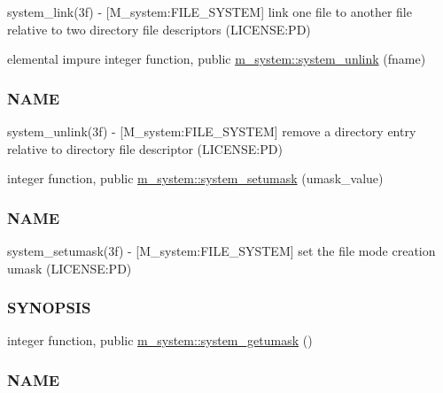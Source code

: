 \begin{DoxyCompactItemize}
\begin{DoxyCompactList}
system\+\_\+link(3f) -\/ \mbox{[}M\+\_\+system\+:F\+I\+L\+E\+\_\+\+S\+Y\+S\+T\+EM\mbox{]} link one file to another file relative to two directory file descriptors (L\+I\+C\+E\+N\+SE\+:PD) \end{DoxyCompactList}\item 
elemental impure integer function, public \mbox{\hyperlink{namespacem__system_a3561c9beafec28439f760d701d55a6b8}{m\+\_\+system\+::system\+\_\+unlink}} (fname)
\begin{DoxyCompactList}\small\item\em \subsubsection*{N\+A\+ME}

system\+\_\+unlink(3f) -\/ \mbox{[}M\+\_\+system\+:F\+I\+L\+E\+\_\+\+S\+Y\+S\+T\+EM\mbox{]} remove a directory entry relative to directory file descriptor (L\+I\+C\+E\+N\+SE\+:PD) \end{DoxyCompactList}\item 
integer function, public \mbox{\hyperlink{namespacem__system_a04fd02e6f5ce2f8ecdfb577e1490feba}{m\+\_\+system\+::system\+\_\+setumask}} (umask\+\_\+value)
\begin{DoxyCompactList}\small\item\em \subsubsection*{N\+A\+ME}

system\+\_\+setumask(3f) -\/ \mbox{[}M\+\_\+system\+:F\+I\+L\+E\+\_\+\+S\+Y\+S\+T\+EM\mbox{]} set the file mode creation umask (L\+I\+C\+E\+N\+SE\+:PD) \subsubsection*{S\+Y\+N\+O\+P\+S\+IS}\end{DoxyCompactList}\item 
integer function, public \mbox{\hyperlink{namespacem__system_aa9ca951be39d2ea738d627cf42c00ddd}{m\+\_\+system\+::system\+\_\+getumask}} ()
\begin{DoxyCompactList}\small\item\em \subsubsection*{N\+A\+ME}


\end{DoxyCompactList}
\end{DoxyCompactItemize}

